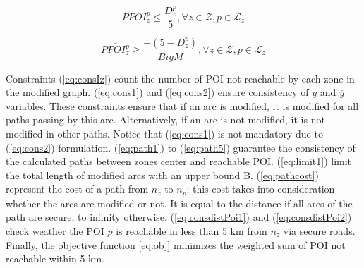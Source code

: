 \begin{equation}\label{eq:consdistPoi1}
    \overline{PPOI_z^p} \leq \frac{D_z^p}{5}, \forall z \in \mathcal{Z}, p \in \mathcal{L}_z 
\end{equation}

\begin{equation}\label{eq:consdistPoi2}
    \overline{PPOI_z^p} \geq \frac{-(5-D_z^p)}{BigM}, \forall z \in \mathcal{Z}, p \in \mathcal{L}_z 
\end{equation}

Constraints (\ref{eq:consIz}) count the number of POI not reachable by each zone in the modified graph. (\ref{eq:cons1}) and (\ref{eq:cons2}) ensure consistency of $y$ and $\overline{y}$ variables. These constraints ensure that if an arc is modified, it is modified for all paths passing by this arc. Alternatively, if an arc is not modified, it is not modified in other paths. Notice that (\ref{eq:cons1})  is not mandatory due to (\ref{eq:cons2}) formulation.  (\ref{eq:path1}) to (\ref{eq:path5}) guarantee the consistency of the calculated paths between zones center and reachable POI.  (\ref{eq:limit1}) limit the total length of modified arcs with an upper bound B. (\ref{eq:pathcost}) represent the  cost of a path from $n_z$ to $n_p$: this cost takes into consideration whether the arcs are modified or not. It is equal to the distance if all arcs of the path are secure, to infinity otherwise. (\ref{eq:consdistPoi1}) and (\ref{eq:consdistPoi2}) check weather the POI $p$ is reachable in less than 5 km from $n_z$ via secure roads. Finally, the objective function \ref{eq:obj} minimizes the weighted sum of POI not reachable within 5 km.